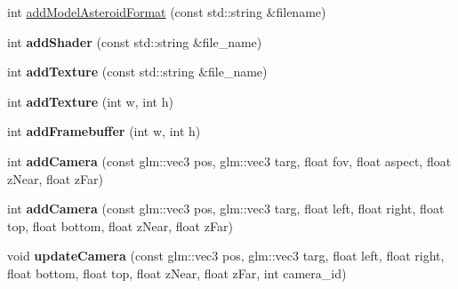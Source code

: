 \begin{DoxyCompactItemize}
\item 
int \hyperlink{classRenderEngine_af81500753fe429679dc05f4250c94359}{add\-Model\-Asteroid\-Format} (const std\-::string \&filename)
\item 
\hypertarget{classRenderEngine_a01111caa3ceac70b47d4698d385be616}{int {\bfseries add\-Shader} (const std\-::string \&file\-\_\-name)}\label{classRenderEngine_a01111caa3ceac70b47d4698d385be616}

\item 
\hypertarget{classRenderEngine_a72e7ae94ed84b1f315dbc7feba575906}{int {\bfseries add\-Texture} (const std\-::string \&file\-\_\-name)}\label{classRenderEngine_a72e7ae94ed84b1f315dbc7feba575906}

\item 
\hypertarget{classRenderEngine_ac598a7edb8a61d32c4e67b865c52363a}{int {\bfseries add\-Texture} (int w, int h)}\label{classRenderEngine_ac598a7edb8a61d32c4e67b865c52363a}

\item 
\hypertarget{classRenderEngine_aae0fc84b1f6e4f35d819d813bb5637fa}{int {\bfseries add\-Framebuffer} (int w, int h)}\label{classRenderEngine_aae0fc84b1f6e4f35d819d813bb5637fa}

\item 
\hypertarget{classRenderEngine_ae05748829c0984debd2bae3678af81f7}{int {\bfseries add\-Camera} (const glm\-::vec3 pos, glm\-::vec3 targ, float fov, float aspect, float z\-Near, float z\-Far)}\label{classRenderEngine_ae05748829c0984debd2bae3678af81f7}

\item 
\hypertarget{classRenderEngine_afcae23444d512d63f2c6bf1fed181e7b}{int {\bfseries add\-Camera} (const glm\-::vec3 pos, glm\-::vec3 targ, float left, float right, float top, float bottom, float z\-Near, float z\-Far)}\label{classRenderEngine_afcae23444d512d63f2c6bf1fed181e7b}

\item 
\hypertarget{classRenderEngine_ac1ebe6afb6fa4491aced904a4792dde0}{void {\bfseries update\-Camera} (const glm\-::vec3 pos, glm\-::vec3 targ, float left, float right, float bottom, float top, float z\-Near, float z\-Far, int camera\-\_\-id)}\label{classRenderEngine_ac1ebe6afb6fa4491aced904a4792dde0}

\end{DoxyCompactItemize}
